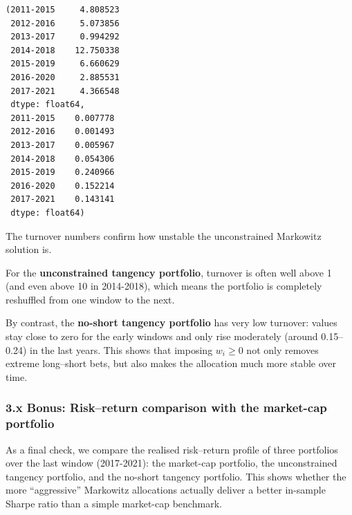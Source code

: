 \documentclass[11pt]{article}
\begin{document}
            \begin{tcolorbox}[breakable, size=fbox, boxrule=.5pt, pad at break*=1mm, opacityfill=0]
\begin{Verbatim}[commandchars=\\\{\}]
(2011-2015     4.808523
 2012-2016     5.073856
 2013-2017     0.994292
 2014-2018    12.750338
 2015-2019     6.660629
 2016-2020     2.885531
 2017-2021     4.366548
 dtype: float64,
 2011-2015    0.007778
 2012-2016    0.001493
 2013-2017    0.005967
 2014-2018    0.054306
 2015-2019    0.240966
 2016-2020    0.152214
 2017-2021    0.143141
 dtype: float64)
\end{Verbatim}
\end{tcolorbox}
        
    The turnover numbers confirm how unstable the unconstrained Markowitz
solution is.

For the \textbf{unconstrained tangency portfolio}, turnover is often
well above 1 (and even above 10 in 2014-2018), which means the portfolio
is completely reshuffled from one window to the next.

By contrast, the \textbf{no-short tangency portfolio} has very low
turnover: values stay close to zero for the early windows and only rise
moderately (around 0.15--0.24) in the last years. This shows that
imposing \(w_i \ge 0\) not only removes extreme long--short bets, but
also makes the allocation much more stable over time.

    \hypertarget{x-bonus-riskreturn-comparison-with-the-market-cap-portfolio}{%
\subsubsection{3.x Bonus: Risk--return comparison with the market-cap
portfolio}\label{x-bonus-riskreturn-comparison-with-the-market-cap-portfolio}}

As a final check, we compare the realised risk--return profile of three
portfolios over the last window (2017-2021): the market-cap portfolio,
the unconstrained tangency portfolio, and the no-short tangency
portfolio. This shows whether the more ``aggressive'' Markowitz
allocations actually deliver a better in-sample Sharpe ratio than a
simple market-cap benchmark.
\end{document}
